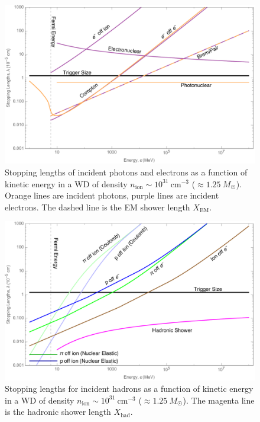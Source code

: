 \documentclass[preprintnumbers,amsmath,amssymb,prd,superscriptaddress]{revtex4}
\begin{document}
\begin{figure}
\includegraphics[scale=.3]{SPhighEM.pdf}
\caption{Stopping lengths of incident photons and electrons as a function of kinetic energy in a WD of density $n_\text{ion} \sim 10^{31}~\text{cm}^{-3}$ ($\approx 1.25 ~M_{\astrosun}$).
Orange lines are incident photons, purple lines are incident electrons.
The dashed line is the EM shower length $X_\text{EM}$.
}
\label{fig:SPhighEM}
\end{figure}

\begin{figure}
\includegraphics[scale=.3]{SPhighHad.pdf}
\caption{Stopping lengths for incident hadrons as a function of kinetic energy in a WD of density $n_\text{ion} \sim 10^{31}~\text{cm}^{-3}$ ($\approx 1.25 ~M_{\astrosun}$).
The magenta line is the hadronic shower length $X_\text{had}$.}
\label{fig:SPhighHad}
\end{figure}

\end{document}

